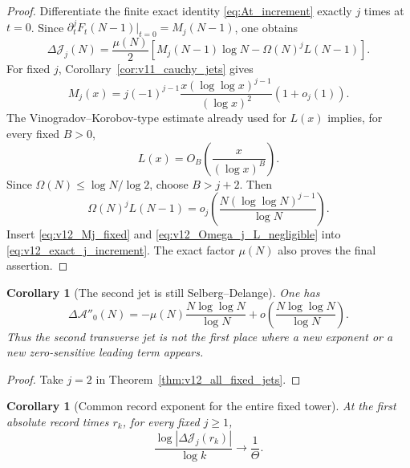 \documentclass[11pt]{amsart}
\numberwithin{equation}{section}
\theoremstyle{plain}
\newtheorem{corollary}[theorem]{Corollary}
\theoremstyle{definition}
\theoremstyle{remark}
\begin{document}
\begin{proof}
Differentiate the finite exact identity \eqref{eq:At_increment} exactly
\(j\) times at \(t=0\).  Since
\(\partial_t^jF_t(N-1)|_{t=0}=M_j(N-1)\), one obtains
\begin{equation}
\Delta\mathcal J_j(N)
=
\frac{\mu(N)}2
\left[
M_j(N-1)\log N-\Omega(N)^jL(N-1)
\right].
\label{eq:v12_exact_j_increment}
\end{equation}
For fixed \(j\), Corollary~\ref{cor:v11_cauchy_jets} gives
\begin{equation}
M_j(x)
=
 j(-1)^{j-1}
 \frac{x(\log\log x)^{j-1}}{(\log x)^2}
 (1+o_j(1)).
\label{eq:v12_Mj_fixed}
\end{equation}
The Vinogradov--Korobov-type estimate already used for \(L(x)\) implies,
for every fixed \(B>0\),
\begin{equation}
L(x)=O_B\!\left(\frac{x}{(\log x)^B}\right).
\label{eq:v12_L_superlog}
\end{equation}
Since \(\Omega(N)\le \log N/\log2\), choose \(B>j+2\).  Then
\begin{equation}
\Omega(N)^jL(N-1)
=o_j\!\left(
\frac{N(\log\log N)^{j-1}}{\log N}
\right).
\label{eq:v12_Omega_j_L_negligible}
\end{equation}
Insert \eqref{eq:v12_Mj_fixed} and
\eqref{eq:v12_Omega_j_L_negligible} into
\eqref{eq:v12_exact_j_increment}.  The exact factor \(\mu(N)\) also proves
the final assertion.
\end{proof}

\begin{corollary}[The second jet is still Selberg--Delange]
\label{cor:v12_second_jet}
One has
\begin{equation}
\boxed{
\Delta\mathcal A''_0(N)
=-\mu(N)\frac{N\log\log N}{\log N}
+o\!\left(\frac{N\log\log N}{\log N}\right).}
\label{eq:v12_second_jet}
\end{equation}
Thus the second transverse jet is not the first place where a new exponent
or a new zero-sensitive leading term appears.
\end{corollary}

\begin{proof}
Take \(j=2\) in Theorem~\ref{thm:v12_all_fixed_jets}.
\end{proof}

\begin{corollary}[Common record exponent for the entire fixed tower]
\label{cor:v12_record_all_jets}
At the first absolute record times \(r_k\), for every fixed \(j\ge1\),
\begin{equation}
\boxed{
\frac{\log|\Delta\mathcal J_j(r_k)|}{\log k}
\longrightarrow\frac1\Theta.}
\label{eq:v12_record_all_jets}
\end{equation}
\end{corollary}
\end{document}
